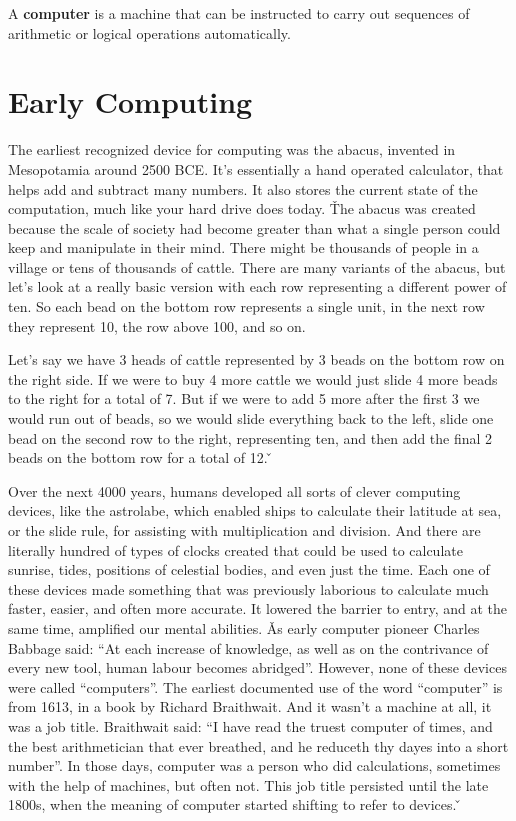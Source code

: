 \bd[Computer]
A \textbf{computer} is a machine that can be instructed to carry out sequences of arithmetic or logical operations
automatically.
\ed

\section{Early Computing}

The earliest recognized device for computing was the abacus, invented in Mesopotamia around 2500 BCE. It's
essentially a hand operated calculator, that helps add and subtract many numbers. It also stores the current state of
the computation, much like your hard drive does today. \v

The abacus was created because the scale of society had become greater than what a single person could keep and
manipulate in their mind. There might be thousands of people in a village or tens of thousands of cattle. There are
many variants of the abacus, but let's look at a really basic version with each row representing a different power of
ten. So each bead on the bottom row represents a single unit, in the next row they represent 10, the row above 100,
and so on.


\vspace{-15pt}

\be
Let's say we have 3 heads of cattle represented by 3 beads on the bottom row on the right side. If we were to buy 4
more cattle we would just slide 4 more beads to the right for a total of 7. But if we were to add 5 more after the
first 3 we would run out of beads, so we would slide everything back to the left, slide one bead on the second row to
the right, representing ten, and then add the final 2 beads on the bottom row for a total of 12. \v
\ee

Over the next 4000 years, humans developed all sorts of clever computing devices, like the astrolabe, which enabled
ships to calculate their latitude at sea, or the slide rule, for assisting with multiplication and division. And
there are literally hundred of types of clocks created that could be used to calculate sunrise, tides, positions of
celestial bodies, and even just the time. Each one of these devices made something that was previously laborious to
calculate much faster, easier, and often more accurate. It lowered the barrier to entry, and at the same time,
amplified our mental abilities. \v

As early computer pioneer Charles Babbage said: ``At each increase of knowledge, as well as on the contrivance of
every new tool, human labour becomes abridged''. However, none of these devices were called ``computers''. The
earliest documented use of the word ``computer'' is from 1613, in a book by Richard Braithwait. And it wasn't a
machine at all, it was a job title. Braithwait said: ``I have read the truest computer of times, and the best
arithmetician that ever breathed, and he reduceth thy dayes into a short number''. In those days, computer was a
person who did calculations, sometimes with the help of machines, but often not. This job title persisted until the
late 1800s, when the meaning of computer started shifting to refer to devices. \v

